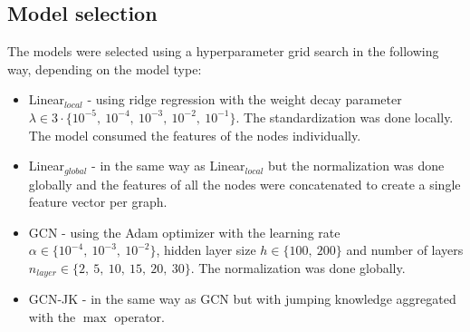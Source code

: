 \subsection*{Model selection}

The models were selected using a hyperparameter grid search in the following way, depending on the model type:
\begin{itemize}
    \item Linear$_{local}$ - using ridge regression with the weight decay parameter
    $\lambda \in 3 \cdot \{10^{-5}, \ 10^{-4}, \ 10^{-3}, \ 10^{-2}, \ 10^{-1}\}$.
    The standardization was done locally.
    The model consumed the features of the nodes individually.
    \item Linear$_{global}$ - in the same way as Linear$_{local}$ but the normalization was done globally and
    the features of all the nodes were concatenated to create a single feature vector per graph.
    \item GCN - using the Adam optimizer with the learning rate $\alpha \in \{10^{-4}, \ 10^{-3}, \ 10^{-2}\}$,
    hidden layer size $h \in \{100, \ 200\}$ and number of layers $n_{layer} \in \{2, \ 5, \ 10, \ 15, \ 20, \ 30\}$.
    The normalization was done globally.
    \item GCN-JK - in the same way as GCN but with jumping knowledge aggregated with the $\max$ operator.
\end{itemize}